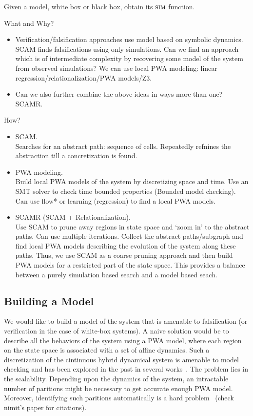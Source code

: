Given a model, white box or black box, obtain its $\mbox{\sc sim}$
function.

What and Why?
\begin{itemize}
    \item Verification/falsification approaches use model
        based on symbolic dynamics. SCAM finds falsifications using
        only simulations. Can we find an approach which is of
        intermediate complexity by recovering some model of the system
        from observed simulations? We can use local PWA modeling:
        linear regression/relationalization/PWA models/Z3.
    \item Can we also further combine the above ideas in ways more
          than one? SCAMR.
\end{itemize}

How?
\begin{itemize}
    \item SCAM.\\
          Searches for an abstract path: sequence of cells.
          Repeatedly refnines the abstraction till a concretization is
          found.
    \item PWA modeling.\\
          Build local PWA models of the system by discretizing space
          and time. Use an SMT solver to check time bounded
          properties (Bounded model checking).
          Can use flow* or learning (regression) to find a
          local PWA models.
    \item SCAMR (SCAM + Relationalization).\\
          Use SCAM to prune away regions in state space and `zoom in'
          to the abstract paths. Can use multiple iterations.
          Collect the abstract paths/subgraph and find local PWA
          models describing the evolution of the system along these
          paths. Thus, we use SCAM as a coarse pruning approach and
          then build PWA models for a restricted part of the state
          space. This provides a balance between a purely simulation
          based search and a model based seach.
\end{itemize}


\subsection{Building a Model} We would like to build a model of the
system that is amenable to falsification (or verification in the case
of white-box systems). A naive solution would be to describe all the
behaviors of the system using a PWA model, where each region on the
state space is associated with a set of affine dynamics. Such a
discretization of the cintinuous hybrid dynamical system is amenable
to model checking and has been explored in the past in several
works~\cite{}. The problem lies in the scalability. Depending upon the
dynamics of the system, an intractable number of paritions might be
necessary to get accurate enough PWA model. Moreover, identifying such
paritions automatically is a hard problem~\cite{} (check nimit's paper
for citations).

